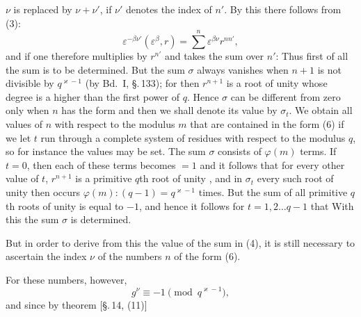 $\nu$ is replaced by $\nu + \nu'$, if $\nu'$ denotes the index of $n'$.
By this there follows from (3):
\[
\varepsilon^{-\beta \nu'} (\varepsilon^{\beta}, r) = \sum^{n} \varepsilon^{\beta \nu} r^{n n'},
\]
and if one therefore multiplies by $r^{n'}$ and takes the sum over $n'$:
Thus first of all the sum
is to be determined. But the sum $\sigma$ always vanishes when
$n + 1$ is not divisible by $q^{\varkappa - 1}$ (by Bd.\ I, \S.\,133); for
then $r^{n+1}$ is a root of unity whose degree is a higher than
the first power of $q$. Hence $\sigma$ can be different from zero
only when $n$ has the form
and then we shall denote its value by $\sigma_t$. We obtain
all values of $n$ with respect to the modulus $m$ that are contained
in the form (6) if we let $t$ run through a complete system of residues
with respect to the modulus $q$, so for instance the values
may be set.
The sum $\sigma$ consists of $\varphi(m)$ terms. If $t = 0$, then
each of these terms becomes $= 1$ and it follows that
for every other value of $t$, $r^{n+1}$ is a primitive $q$th root of unity
, and in $\sigma_t$ every such root of unity then occurs
$\varphi(m) : (q - 1) = q^{\varkappa - 1}$ times. But the sum of all primitive
$q$th roots of unity is equal to $-1$, and hence it follows for
$t = 1, 2 \ldots q - 1$ that
With this the sum $\sigma$ is determined.

But in order to derive from this the value of the sum in (4),
it is still necessary to ascertain the index $\nu$ of the numbers $n$ of the form (6).

For these numbers, however,
\[
g^{\nu} \equiv -1 \pmod{q^{\varkappa - 1}},
\]
and since by  theorem [\S.\,14, (11)]
